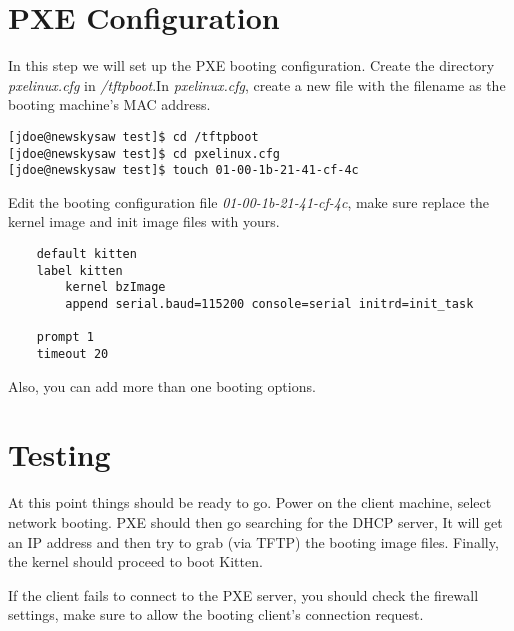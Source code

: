 \documentclass[11pt]{article}
\begin{document}
\section{PXE Configuration}
In this step we will set up the PXE booting configuration. 
Create the directory {\em pxelinux.cfg} in {\em /tftpboot}.In {\em pxelinux.cfg}, create a new file with the filename as the booting machine's MAC address.
\begin{verbatim}
[jdoe@newskysaw test]$ cd /tftpboot
[jdoe@newskysaw test]$ cd pxelinux.cfg
[jdoe@newskysaw test]$ touch 01-00-1b-21-41-cf-4c
\end{verbatim}
Edit the booting configuration file {\em 01-00-1b-21-41-cf-4c}, make sure replace the kernel image and init image files with yours.
\begin{verbatim}
    default kitten
    label kitten
        kernel bzImage
        append serial.baud=115200 console=serial initrd=init_task

    prompt 1 
    timeout 20
\end{verbatim}
Also, you can add more than one booting options.
\section{Testing}

At this point things should be ready to go. Power on the client machine, select network booting. PXE should then go searching for the DHCP server, It will get an IP address and then try to grab (via TFTP) the booting image files. Finally, the kernel should proceed to boot Kitten.

If the client fails to connect to the PXE server, you should check the firewall settings, make sure to allow the booting client's connection request.
\end{document}
